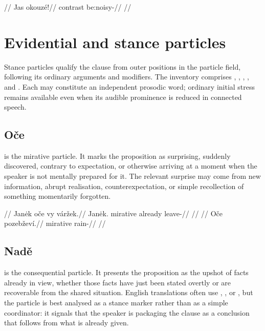 \pex
\begingl
\glpreamble {}//
\gla Jas okouzé!//
\glb contrast be:noisy-\Proh{}//
\glft {}//
\endgl
\xe

\section{Evidential and stance particles}\label{sec:class3-particles}

Stance particles qualify the clause from outer positions in the particle
field, following its ordinary arguments and modifiers. The inventory comprises
, , ,
, and . Each may constitute an independent prosodic
word; ordinary initial stress remains available even when its audible
prominence is reduced in connected speech.

\subsection{Oče}  is the mirative particle. It marks the proposition
as surprising, suddenly discovered, contrary to expectation, or otherwise
arriving at a moment when the speaker is not mentally prepared for it. The
relevant surprise may come from new information, abrupt realisation,
counterexpectation, or simple recollection of something momentarily forgotten.

\pex
\a
\begingl
\glpreamble {}//
\gla Janėk oče vy váržek.//
\glb Janėk.\Dir{} mirative already leave-\Pf{}//
\glft {}//
\endgl
\a
\begingl
\glpreamble {}//
\gla Oče pozebževí.//
\glb mirative rain-\Cont{}//
\glft {}//
\endgl
\xe

\subsection{Nadě}  is the consequential particle. It presents the
proposition as the upshot of facts already in view, whether those facts have
just been stated overtly or are recoverable from the shared situation. English
translations often use , , or , but
the particle is best analysed as a stance marker rather than as a simple
coordinator: it signals that the speaker is packaging the clause as a
conclusion that follows from what is already given.

